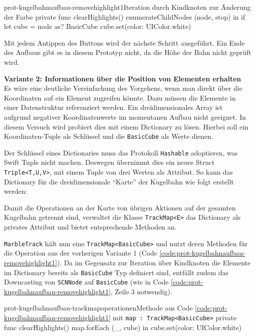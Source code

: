 \begin{description}
	\begin{code}{prot-kugelbahnaufbau-removehighlight1}{Iteration durch Kindknoten zur Änderung der Farbe}
		private func clearHighlights() {
			enumerateChildNodes { (node, stop) in
				if let cube = node as? BasicCube {
					cube.set(color: UIColor.white)
				}
			}
		}
	\end{code}

	Mit jedem Antippen des Buttons wird der nächste Schritt ausgeführt. Ein Ende des Aufbaus gibt es in diesem Prototyp nicht, da die Höhe der Bahn nicht geprüft wird.

	\textbf{Variante 2: Informationen über die Position von Elementen erhalten}\\
	Es wäre eine deutliche Vereinfachung des Vorgehens, wenn man direkt über die Koordinaten auf ein Element zugreifen könnte. Dazu müssen die Elemente in einer Datenstruktur referenziert werden. Ein dreidimensionales Array ist aufgrund negativer Koordinatenwerte im momentanen Aufbau nicht geeignet. In diesem Versuch wird probiert dies mit einem Dictionary zu lösen. Hierbei soll ein Koordinaten-Tuple als Schlüssel und die \texttt{BasicCube} als Werte dienen.
	
	Der Schlüssel eines Dictionaries muss das Protokoll \texttt{Hashable} adoptieren, was Swift Tuple nicht machen. Deswegen übernimmt dies ein neues Struct \texttt{Triple<T,U,V>}, mit einem Tuple von drei Werten als Attribut. So kann das Dictionary für die dreidimensionale "`Karte"' der Kugelbahn wie folgt erstellt werden:


	Damit die Operationen an der Karte von übrigen Aktionen auf der gesamten Kugelbahn getrennt sind, verwaltet die Klasse \texttt{TrackMap<E>} das Dictionary als privates Attribut und bietet entsprechende Methoden an.

	\texttt{MarbleTrack} hält nun eine \texttt{TrackMap<BasicCube>} und nutzt deren Methoden für die Operation aus der vorherigen Variante 1 (Code \ref{code:prot-kugelbahnaufbau-removehighlight1}). Da im Gegensatz zur Iteration über Kindknoten die Elemente im Dictionary bereits als \texttt{BasicCube} Typ definiert sind, entfällt zudem das Downcasting von \texttt{SCNNode} auf \texttt{BasicCube} (wie in Code \ref{code:prot-kugelbahnaufbau-removehighlight1}, Zeile 3 notwendig).

	\begin{code}{prot-kugelbahnaufbau-trackmapoperationen}{Methode aus Code \ref{code:prot-kugelbahnaufbau-removehighlight1} mit \texttt{map : TrackMap<BasicCube>}}
		private func clearHighlights() {
			map.forEach { (_, cube) in
				cube.set(color: UIColor.white)
			}
		}
	\end{code}


\end{description}
